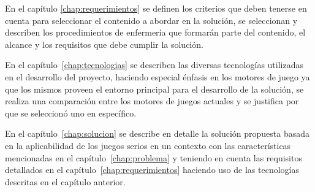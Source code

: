 


En el capítulo \ref{chap:requerimientos} se definen los criterios que deben tenerse en 
cuenta para seleccionar el contenido a abordar en la solución, se seleccionan y describen 
los procedimientos de enfermería que formarán parte del contenido, el alcance  
y los requisitos que debe cumplir la solución.



En el capítulo~\ref{chap:tecnologias} se describen las diversas tecnologías utilizadas 
en el desarrollo del proyecto, haciendo especial énfasis en los motores de juego ya que 
los mismos proveen el entorno principal para el desarrollo de la solución, se realiza 
una comparación entre los motores de juegos actuales y se justifica por que se seleccionó 
uno en específico. 





En el capítulo~\ref{chap:solucion} se describe en detalle la solución propuesta basada en 
la aplicabilidad de los juegos serios en un contexto con las características mencionadas en 
el capítulo~\ref{chap:problema} y teniendo en cuenta las requisitos detallados en el 
capítulo~\ref{chap:requerimientos} haciendo uso de las tecnologías descritas en el capítulo 
anterior. 

